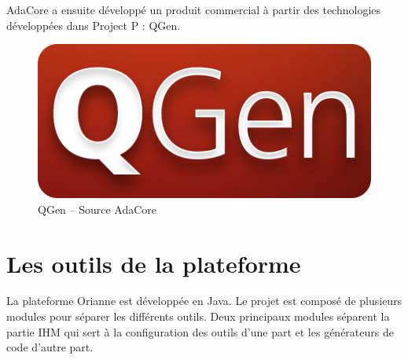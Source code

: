AdaCore a ensuite développé un produit commercial à partir des
technologies développées dans Project P : QGen.

\begin{figure}[h]
  \centering
  \includegraphics[scale=0.2]{images/qgen}
  \caption{QGen -- Source AdaCore}
  \label{fig:qgen}
\end{figure}

\section{Les outils de la plateforme}
La plateforme Orianne est développée en Java. Le projet est composé de plusieurs modules pour séparer les différents outils.
Deux principaux modules séparent la partie IHM qui sert à la configuration des outils d'une part et les générateurs de code d'autre part.
